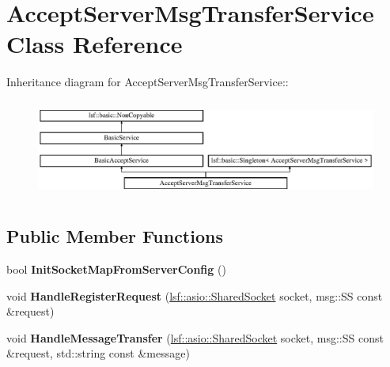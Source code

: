 \hypertarget{classAcceptServerMsgTransferService}{
\section{AcceptServerMsgTransferService Class Reference}
\label{classAcceptServerMsgTransferService}
}
Inheritance diagram for AcceptServerMsgTransferService::\begin{figure}[H]
\begin{center}
\leavevmode
\includegraphics[height=3.23699cm]{classAcceptServerMsgTransferService}
\end{center}
\end{figure}
\subsection*{Public Member Functions}
\begin{DoxyCompactItemize}
\item 
\hypertarget{classAcceptServerMsgTransferService_a0014b5858da33289e9abba6f3dfc1fa1}{
bool {\bfseries InitSocketMapFromServerConfig} ()}
\label{classAcceptServerMsgTransferService_a0014b5858da33289e9abba6f3dfc1fa1}

\item 
\hypertarget{classAcceptServerMsgTransferService_a7ad2ad65e493f9a06998b4e07191cc7b}{
void {\bfseries HandleRegisterRequest} (\hyperlink{classlsf_1_1asio_1_1SharedSocket}{lsf::asio::SharedSocket} socket, msg::SS const \&request)}
\label{classAcceptServerMsgTransferService_a7ad2ad65e493f9a06998b4e07191cc7b}

\item 
\hypertarget{classAcceptServerMsgTransferService_a1b2d4772183ac87744320260ec20af03}{
void {\bfseries HandleMessageTransfer} (\hyperlink{classlsf_1_1asio_1_1SharedSocket}{lsf::asio::SharedSocket} socket, msg::SS const \&request, std::string const \&message)}
\label{classAcceptServerMsgTransferService_a1b2d4772183ac87744320260ec20af03}

\end{DoxyCompactItemize}
